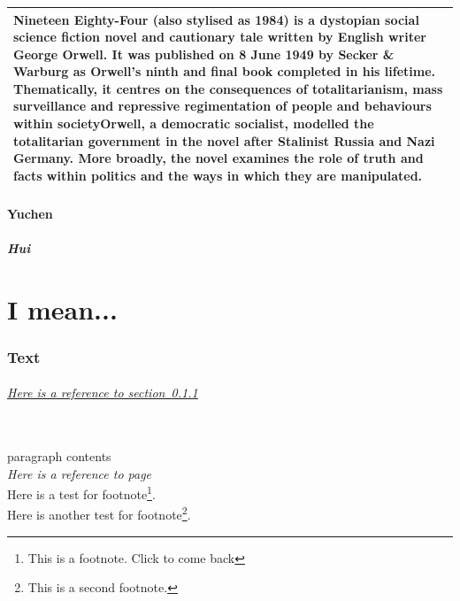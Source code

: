 \documentclass[11pt,oneside,a4paper]{article}
\begin{document}
      \vspace{1em}
      \begin{center}
            
            \begin{tabular}[]{|p{7cm}|}
            \hline  
            Nineteen Eighty-Four (also stylised as 1984) is a dystopian social science fiction novel and cautionary tale written by English writer George Orwell. It was published on 8 June 1949 by Secker \& Warburg as Orwell's ninth and final book completed in his lifetime. Thematically, it centres on the consequences of totalitarianism, mass surveillance and repressive regimentation of people and behaviours within societyOrwell, a democratic socialist, modelled the totalitarian government in the novel after Stalinist Russia and Nazi Germany. More broadly, the novel examines the role of truth and facts within politics and the ways in which they are manipulated. \\
            \hline
            \end{tabular}
      \end{center}


      \subsection{Yuchen}
            \subsubsection{Hui}
                  \label{ssse:Hui}

\part{I mean...}
\section{Text}
      \paragraph{\underline{Here is a reference to section~\ref{ssse:Hui}}}~{}\\  
            paragraph contents \\
      \emph{Here is a reference to page~\pageref{se:sectionYuchen}}\\
      Here is a test for footnote\footnote{This is a footnote. Click to come back}.\\
      Here is another test for footnote\footnote{This is a second footnote.}.
\end{document}
